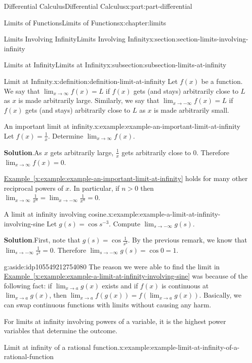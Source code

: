 \documentclass[twoside,10pt,]{book}
\newcommand{\blocktitlefont}{\relax}
\newcommand{\xreffont}{\relax}
\numberwithin{equation}{part}
\begin{document}
\begin{partptx}{Differential Calculus}{}{Differential Calculus}{}{}{x:part:part-differential}
\begin{chapterptx}{Limits of Functions}{}{Limits of Functions}{}{}{x:chapter:limits}
\begin{sectionptx}{Limits Involving Infinity}{}{Limits Involving Infinity}{}{}{x:section:section-limits-involving-infinity}
\begin{subsectionptx}{Limits at Infinity}{}{Limits at Infinity}{}{}{x:subsection:subsection-limits-at-infinity}
\begin{definition}{Limit at Infinity.}{x:definition:definition-limit-at-infinity}
Let \(f(x)\) be a function. We say that \(\lim_{x\to\infty}f(x) = L\) if \(f(x)\) gets (and stays) arbitrarily close to \(L\) as \(x\) is made arbitrarily large. Similarly, we say that \(\lim_{x\to-\infty}f(x) = L\) if \(f(x)\) gets (and stays) arbitrarily close to \(L\) as \(x\) is made arbitrarily small.%
\end{definition}
\begin{example}{An important limit at infinity.}{x:example:example-an-important-limit-at-infinity}%
Let \(f(x) = \frac{1}{x}\). Determine \(\lim_{x\to\infty}f(x)\).%
\par\smallskip%
\noindent\textbf{\blocktitlefont Solution}.\hypertarget{g:solution:idp105549212747040}{}\quad{}As \(x\) gets arbitrarily large, \(\frac{1}{x}\) gets arbitrarily close to \(0\). Therefore \(\lim_{x\to\infty}f(x) = 0\).%
\end{example}
\hyperref[x:example:example-an-important-limit-at-infinity]{Example~{\xreffont\ref{x:example:example-an-important-limit-at-infinity}}} holds for many other reciprocal powers of \(x\). In particular, if \(n>0\) then \(\lim_{x\to\infty}\frac{1}{x^{n}} = \lim_{x\to-\infty}\frac{1}{x^{n}} = 0\).%
\begin{example}{A limit at infinity involving cosine.}{x:example:example-a-limit-at-infinity-involving-sine}%
Let \(g(s) = \cos s^{-3}\). Compute \(\lim_{s\to-\infty}g(s)\).%
\par\smallskip%
\noindent\textbf{\blocktitlefont Solution}.\hypertarget{g:solution:idp105549212752544}{}\quad{}First, note that \(g(s) = \cos\frac{1}{s^{3}}\). By the previous remark, we know that \(\lim_{s\to-\infty}\frac{1}{s^{3}} = 0\). Therefore \(\lim_{s\to-\infty}g(s) = \cos0 = 1\).%
\end{example}
\begin{aside}{}{g:aside:idp105549212754080}%
The reason we were able to find the limit in \hyperref[x:example:example-a-limit-at-infinity-involving-sine]{Example~{\xreffont\ref{x:example:example-a-limit-at-infinity-involving-sine}}} was because of the following fact: if \(\lim_{x\to a}g(x)\) exists and if \(f(x)\) is continuous at \(\lim_{x\to a}g(x)\), then \(\lim_{x\to a}f(g(x)) = f(\lim_{x\to a}g(x))\). Basically, we can swap continuous functions with limits without causing any harm.%
\end{aside}
For limits at infinity involving powers of a variable, it is the highest power variables that determine the outcome.%
\begin{example}{Limit at infinity of a rational function.}{x:example:example-limit-at-infinity-of-a-rational-function}%

\end{example}
\end{subsectionptx}
\end{sectionptx}
\end{chapterptx}
\end{partptx}
\end{document}
